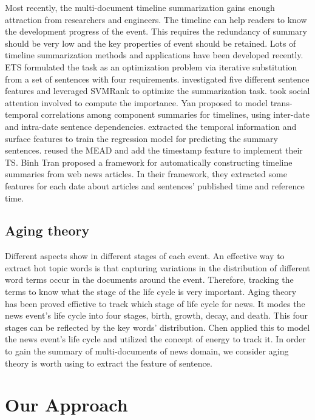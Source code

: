 \documentclass{acm_proc_article-sp}
\begin{document}
Most recently, the multi-document timeline summarization gains enough attraction from researchers and engineers.
The timeline can help readers to know the development  progress of the event.
This requires the redundancy of summary should be very low and the key properties of event should be retained. 
Lots of timeline summarization methods and applications have been developed recently. 
ETS\cite{2011-Yan-p745-754} formulated the task as an optimization  problem via iterative substitution from a set of sentences with four requirements. 
\cite{tran2013leveraging} investigated five different sentence features and leveraged SVMRank to optimize the summarization task. 
\cite{zhao2013timeline} took social attention involved to compute the importance. 
Yan\cite{Yan-2011-TGT-2145432-2145483} proposed to model trans-temporal correlations among component summaries for timelines, using inter-date and intra-date sentence dependencies.
\cite{binh2013structured} extracted the temporal information and surface features to train the regression model for predicting the summary sentences. 
\cite{2008-Nedunchelian-p480-485} reused the MEAD and add the timestamp feature to implement their TS.
Binh Tran\cite{binh2013predicting} proposed a framework for automatically constructing timeline summaries from web news articles. In their framework, they extracted some features for each date about articles and sentences' published time and reference time.

\subsection{Aging theory}

Different aspects show in different stages of each event.
An effective way to extract hot topic words is that capturing variations  in the distribution of different word terms occur in the documents around the event.
Therefore, tracking the terms to know what the stage of the life cycle is very important.
Aging theory has been proved effictive to track which stage of life cycle for news. 
It modes the news event's life cycle into four stages, birth, growth, decay, and death.
This four stages can be reflected by the key words' distribution.
Chen\cite{2007-Chen-p1016-1025}\cite{chen2003life} applied this to model the news event's life cycle and utilized the concept of energy to track it. 
In order to gain the summary of multi-documents of news domain, we consider aging theory is worth using to extract the feature of sentence.

%
\section{Our Approach}
%
\end{document}
